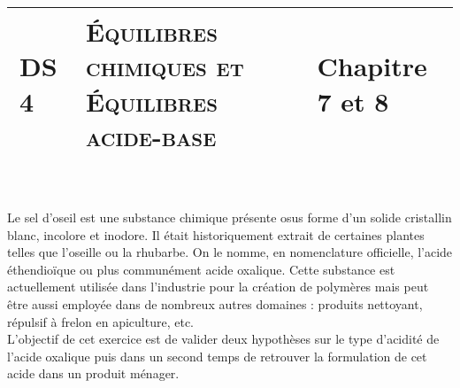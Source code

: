 \documentclass[a4paper,11pt]{article}
\title{\vspace{-1cm}\large 
	\begin{tabular}{|>{\centering}m{5cm}|>{\centering}m{8cm}|>{\centering\arraybackslash}m{4cm}|}
	\hline
	DS 4 & \textbf{\textsc{Équilibres chimiques et Équilibres acide-base}} &  Chapitre 7 et 8\\
	\hline
	\end{tabular}}
\date{}
\begin{document}
\maketitle
\vspace{-2cm}
Le sel d'oseil est une substance chimique présente osus forme d'un solide cristallin blanc, incolore et inodore. Il était historiquement extrait de certaines plantes telles que l'oseille ou la rhubarbe. On le nomme, en nomenclature officielle, l'acide éthendioïque ou plus communément acide oxalique. Cette substance est actuellement utilisée dans l'industrie pour la création de polymères mais peut être aussi employée dans de nombreux autres domaines : produits nettoyant, répulsif à frelon en apiculture, etc.\\
L'objectif de cet exercice est de valider deux hypothèses sur le type d'acidité de l'acide oxalique puis dans un second temps de retrouver la formulation de cet acide dans un produit ménager.
\end{document}
